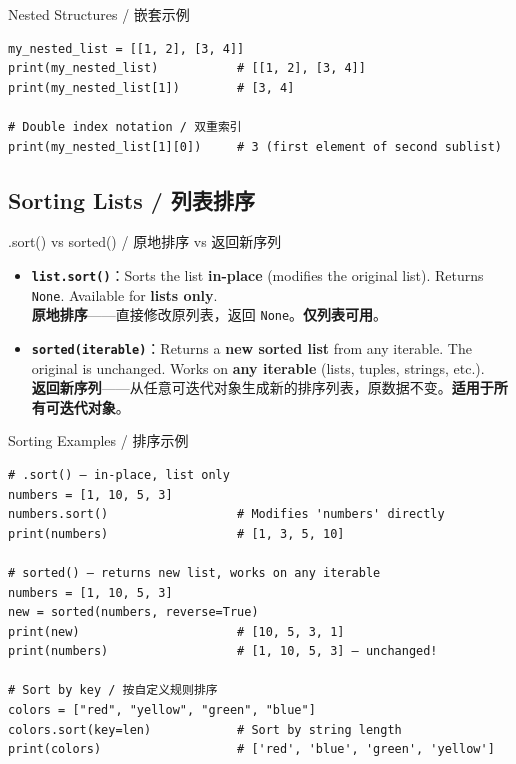 \documentclass[11pt,a4paper]{report}
\let\oldtexttt\texttt
\renewcommand{\texttt}[1]{\textcolor{mainblue}{\oldtexttt{#1}}}
\begin{document}
\begin{examplebox}{Nested Structures / 嵌套示例}
\begin{lstlisting}
my_nested_list = [[1, 2], [3, 4]]
print(my_nested_list)           # [[1, 2], [3, 4]]
print(my_nested_list[1])        # [3, 4]

# Double index notation / 双重索引
print(my_nested_list[1][0])     # 3 (first element of second sublist)
\end{lstlisting}
\end{examplebox}

\subsection{Sorting Lists / 列表排序}

\begin{concept}{.sort() vs sorted() / 原地排序 vs 返回新序列}
    \begin{itemize}[itemsep=0.5em]
        \item \textbf{\texttt{list.sort()}}：Sorts the list \textbf{in-place} (modifies the original list). Returns \texttt{None}. Available for \textbf{lists only}. \\
        \textbf{原地排序}——直接修改原列表，返回 \texttt{None}。\textbf{仅列表可用}。
        \item \textbf{\texttt{sorted(iterable)}}：Returns a \textbf{new sorted list} from any iterable. The original is unchanged. Works on \textbf{any iterable} (lists, tuples, strings, etc.). \\
        \textbf{返回新序列}——从任意可迭代对象生成新的排序列表，原数据不变。\textbf{适用于所有可迭代对象}。
    \end{itemize}
\end{concept}

\begin{examplebox}{Sorting Examples / 排序示例}
\begin{lstlisting}
# .sort() — in-place, list only
numbers = [1, 10, 5, 3]
numbers.sort()                  # Modifies 'numbers' directly
print(numbers)                  # [1, 3, 5, 10]

# sorted() — returns new list, works on any iterable
numbers = [1, 10, 5, 3]
new = sorted(numbers, reverse=True)
print(new)                      # [10, 5, 3, 1]
print(numbers)                  # [1, 10, 5, 3] — unchanged!

# Sort by key / 按自定义规则排序
colors = ["red", "yellow", "green", "blue"]
colors.sort(key=len)            # Sort by string length
print(colors)                   # ['red', 'blue', 'green', 'yellow']
\end{lstlisting}
\end{examplebox}
\end{document}
